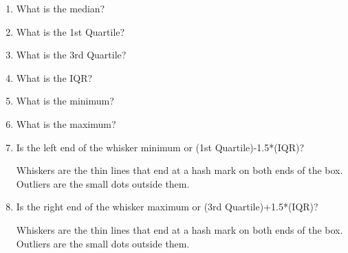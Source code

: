\documentclass{ximera}
\begin{document}
\begin{problem}
\begin{enumerate}
    \item What is the median?
 \begin{multipleChoice}
\end{multipleChoice}
    \item What is the 1st Quartile?
 \begin{multipleChoice}
\end{multipleChoice}
    \item What is the 3rd Quartile?
 \begin{multipleChoice}
\end{multipleChoice}
    \item What is the IQR?
 \begin{multipleChoice}
\end{multipleChoice}
    \item What is the minimum?
 \begin{multipleChoice}
\end{multipleChoice}
    \item What is the maximum?
 \begin{multipleChoice}
\end{multipleChoice}
    \item Is the left end of the whisker minimum or (1st Quartile)-1.5*(IQR)?
    \begin{hint}
        Whiskers are the thin lines that end at a hash mark on both ends of the box. Outliers are the small dots outside them.
    \end{hint}
 \begin{multipleChoice}
\end{multipleChoice}
    \item Is the right end of the whisker maximum or (3rd Quartile)+1.5*(IQR)?
    \begin{hint}
        Whiskers are the thin lines that end at a hash mark on both ends of the box. Outliers are the small dots outside them.
    \end{hint}
 \begin{multipleChoice}
\end{multipleChoice}

\end{enumerate}
\end{problem}
\end{document}
